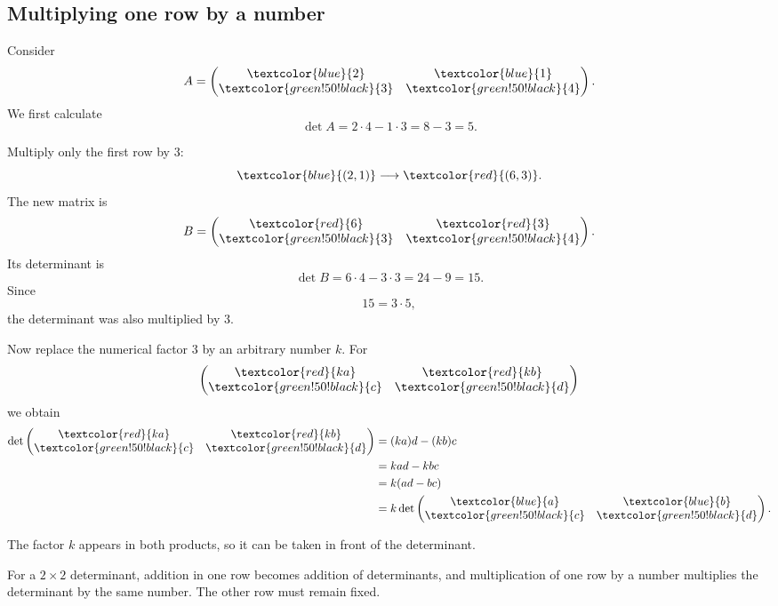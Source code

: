 \subsection{Multiplying one row by a number}

Consider
\[
A=
\begin{pmatrix}
\textcolor{blue}{2}&\textcolor{blue}{1}\\
\textcolor{green!50!black}{3}&\textcolor{green!50!black}{4}
\end{pmatrix}.
\]
We first calculate
\[
\det A=2\cdot4-1\cdot3=8-3=5.
\]

Multiply only the first row by \(3\):
\[
\textcolor{blue}{(2,1)}\longrightarrow\textcolor{red}{(6,3)}.
\]
The new matrix is
\[
B=
\begin{pmatrix}
\textcolor{red}{6}&\textcolor{red}{3}\\
\textcolor{green!50!black}{3}&\textcolor{green!50!black}{4}
\end{pmatrix}.
\]
Its determinant is
\[
\det B=6\cdot4-3\cdot3=24-9=15.
\]
Since
\[
15=3\cdot5,
\]
the determinant was also multiplied by \(3\).

Now replace the numerical factor \(3\) by an arbitrary number \(k\). For
\[
\begin{pmatrix}
\textcolor{red}{ka}&\textcolor{red}{kb}\\
\textcolor{green!50!black}{c}&\textcolor{green!50!black}{d}
\end{pmatrix}
\]
we obtain
\[
\begin{aligned}
\det
\begin{pmatrix}
\textcolor{red}{ka}&\textcolor{red}{kb}\\
\textcolor{green!50!black}{c}&\textcolor{green!50!black}{d}
\end{pmatrix}
&=(ka)d-(kb)c\\
&=kad-kbc\\
&=k(ad-bc)\\
&=
k\det
\begin{pmatrix}
\textcolor{blue}{a}&\textcolor{blue}{b}\\
\textcolor{green!50!black}{c}&\textcolor{green!50!black}{d}
\end{pmatrix}.
\end{aligned}
\]

The factor \(k\) appears in both products, so it can be taken in front of the determinant.

\begin{theorembox}
For a \(2\times2\) determinant, addition in one row becomes addition of determinants, and multiplication of one row by a number multiplies the determinant by the same number. The other row must remain fixed.
\end{theorembox}

